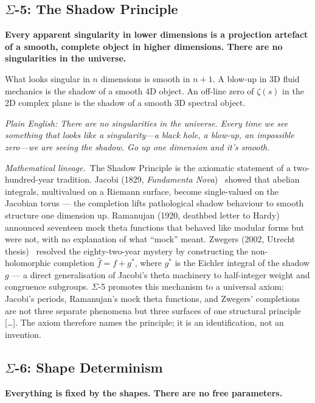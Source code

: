 \subsection*{$\Sigma$-5: The Shadow Principle}
\par\smallskip
\textbf{Every apparent singularity in lower dimensions is a projection artefact of a smooth, complete object in higher dimensions.  There are no singularities in the universe.}

What looks singular in $n$ dimensions is smooth in $n+1$.  A blow-up in 3D fluid mechanics is the shadow of a smooth 4D object.  An off-line zero of $\zeta(s)$ in the 2D complex plane is the shadow of a smooth 3D spectral object.

\emph{Plain English: There are no singularities in the universe.  Every time we see something that looks like a singularity---a black hole, a blow-up, an impossible zero---we are seeing the shadow.  Go up one dimension and it's smooth.}

\smallskip

\noindent\emph{Mathematical lineage.}\ The Shadow Principle is the axiomatic statement of a two-hundred-year tradition.  Jacobi (1829, \emph{Fundamenta Nova})~\cite{Jacobi1829} showed that abelian integrals, multivalued on a Riemann surface, become single-valued on the Jacobian torus --- the completion lifts pathological shadow behaviour to smooth structure one dimension up.  Ramanujan (1920, deathbed letter to Hardy)~\cite{Ramanujan1920} announced seventeen mock theta functions that behaved like modular forms but were not, with no explanation of what ``mock'' meant.  Zwegers (2002, Utrecht thesis)~\cite{Zwegers2002} resolved the eighty-two-year mystery by constructing the non-holomorphic completion $\hat{f} = f + g^{*}$, where $g^{*}$ is the Eichler integral of the shadow $g$ --- a direct generalisation of Jacobi's theta machinery to half-integer weight and congruence subgroups.  $\Sigma$-5 promotes this mechanism to a universal axiom: Jacobi's periods, Ramanujan's mock theta functions, and Zwegers' completions are not three separate phenomena but three surfaces of one structural principle [\ldots].  The axiom therefore names the principle; it is an identification, not an invention.

\subsection*{$\Sigma$-6: Shape Determinism}
\par\smallskip
\textbf{Everything is fixed by the shapes.  There are no free parameters.}

